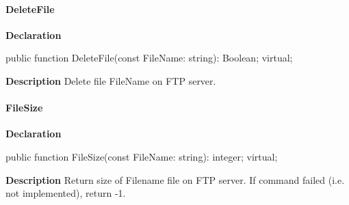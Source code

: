 \documentclass{report}
\newif\ifpdf
\begin{document}
\paragraph*{DeleteFile}\hspace*{\fill}

\label{ftpsend.TFTPSend-DeleteFile}
\begin{list}{}{
\setlength{\itemindent}{0cm}
\setlength{\listparindent}{0cm}
\setlength{\leftmargin}{\evensidemargin}
\addtolength{\leftmargin}{\tmplength}
\settowidth{\labelsep}{X}
\addtolength{\leftmargin}{\labelsep}
\setlength{\labelwidth}{\tmplength}
}
\item[\textbf{Declaration}\hfill]
\ifpdf
\begin{flushleft}
\fi
\begin{ttfamily}
public function DeleteFile(const FileName: string): Boolean; virtual;\end{ttfamily}

\ifpdf
\end{flushleft}
\fi

\par
\item[\textbf{Description}]
Delete file FileName on FTP server.

\end{list}
\paragraph*{FileSize}\hspace*{\fill}

\label{ftpsend.TFTPSend-FileSize}
\begin{list}{}{
\setlength{\itemindent}{0cm}
\setlength{\listparindent}{0cm}
\setlength{\leftmargin}{\evensidemargin}
\addtolength{\leftmargin}{\tmplength}
\settowidth{\labelsep}{X}
\addtolength{\leftmargin}{\labelsep}
\setlength{\labelwidth}{\tmplength}
}
\item[\textbf{Declaration}\hfill]
\ifpdf
\begin{flushleft}
\fi
\begin{ttfamily}
public function FileSize(const FileName: string): integer; virtual;\end{ttfamily}

\ifpdf
\end{flushleft}
\fi

\par
\item[\textbf{Description}]
Return size of Filename file on FTP server. If command failed (i.e. not implemented), return {-}1.

\end{list}
\end{document}

